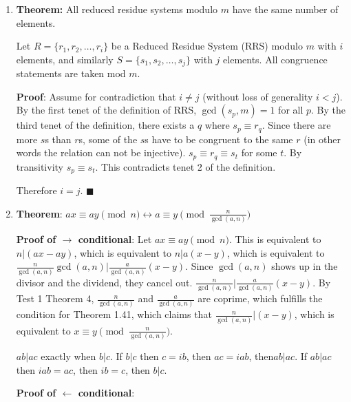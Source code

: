 \documentclass[12pt,letterpaper]{article}
\newcommand{\qedhere}{{\tiny \(\blacksquare\)}}
\begin{document}
\begin{enumerate}[leftmargin=0mm]
\item \textbf{Theorem:} All reduced residue systems modulo \(m\) have the same number of elements.

Let \(R = \{r_1, r_2, \dots, r_i\}\) be a Reduced Residue System (RRS) modulo \(m\) with \(i\) elements, and similarly \(S = \{s_1, s_2, \dots, s_j\}\) with \(j\) elements. All congruence statements are taken mod \(m\).

\textbf{Proof}: Assume for contradiction that \(i \neq j\) (without loss of generality \(i < j\)). By the first tenet of the definition of RRS, \(\gcd(s_p, m) = 1\) for all \(p\). By the third tenet of the definition, there exists a \(q\) where \(s_p \equiv r_q\). Since there are more \(s\)s than \(r\)s, some of the \(s\)s have to be congruent to the same \(r\) (in other words the relation can not be injective). \(s_p \equiv r_q \equiv s_t\) for some \(t\). By transitivity \(s_p \equiv s_t\). This contradicts tenet 2 of the definition.

Therefore \(i = j\). \qedhere

\item \textbf{Theorem}: \(ax \equiv ay \pmod n \leftrightarrow a \equiv y \pmod {\frac{n}{\gcd(a, n)}}\)

\textbf{Proof of \(\rightarrow\) conditional}: Let \(ax \equiv ay \pmod n\). This is equivalent to \(n|(ax - ay)\), which is equivalent to \(n|a(x-y)\), which is equivalent to \(\frac{n}{\gcd(a, n)} \gcd(a, n) \vert \frac{a}{\gcd(a, n)}(x-y)\). Since \(\gcd(a, n)\) shows up in the divisor and the dividend, they cancel out. \(\frac{n}{\gcd(a, n)} \vert \frac{a}{\gcd(a, n)} (x - y)\). By Test 1 Theorem 4, \(\frac{n}{\gcd(a, n)}\) and \(\frac{a}{\gcd(a, n)}\) are coprime, which fulfills the condition for Theorem 1.41, which claims that \(\frac{n}{\gcd(a, n)} \vert (x - y)\), which is equivalent to \(x \equiv y \pmod{\frac{n}{\gcd(a, n)}}\).

\(ab|ac\) exactly when \(b|c\). If \(b|c\) then \(c = ib\), then \(ac = iab\), then\(ab|ac\). If \(ab|ac\) then \(iab = ac\), then \(ib = c\), then \(b|c\).

\textbf{Proof of \(\leftarrow\) conditional}:

\end{enumerate}
\end{document}
